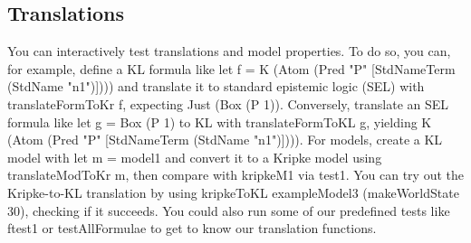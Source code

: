 \documentclass[12pt,a4paper]{article}
\begin{document}
\subsection{Translations}
You can interactively test translations and model properties. To do so, you can, for example, define a KL formula like let f = K (Atom (Pred "P" [StdNameTerm (StdName "n1")]))) and translate it to standard epistemic logic (SEL) with translateFormToKr f, expecting Just (Box (P 1)). 
Conversely, translate an SEL formula like let g = Box (P 1) to KL with translateFormToKL g, yielding K (Atom (Pred "P" [StdNameTerm (StdName "n1")]))). 
For models, create a KL model with let m = model1 and convert it to a Kripke model using translateModToKr m, then compare with kripkeM1 via test1. You can try out the Kripke-to-KL translation by using kripkeToKL exampleModel3 (makeWorldState 30), checking if it succeeds. You could also run some of our predefined tests like ftest1 or testAllFormulae to get to know our translation functions.


%

% 
\end{document}
